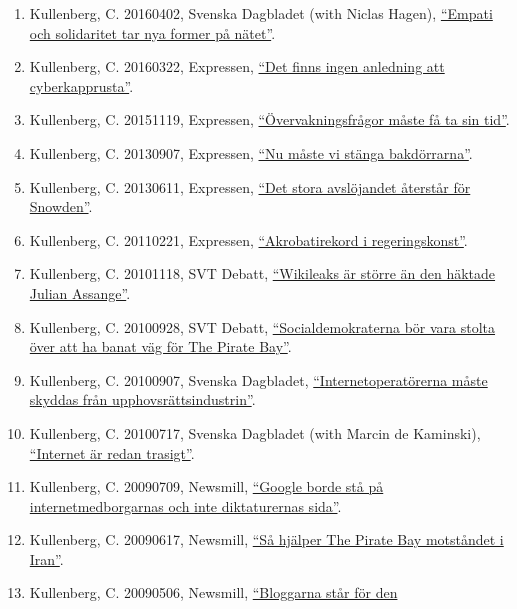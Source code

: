\documentclass[
]{article}
\providecommand{\tightlist}{%
  \setlength{\itemsep}{0pt}\setlength{\parskip}{0pt}}
\begin{document}
\begin{enumerate}
\def\labelenumi{\arabic{enumi}.}
\tightlist
\item
  Kullenberg, C. 20160402, Svenska Dagbladet (with Niclas Hagen),
  \href{http://www.svd.se/empati-och-solidaritet-tar-nya-former-pa-natet}{``Empati
  och solidaritet tar nya former på nätet''}.
\item
  Kullenberg, C. 20160322, Expressen,
  \href{http://www.expressen.se/debatt/finns-ingen-anledning-att-cyberkapprusta/}{``Det
  finns ingen anledning att cyberkapprusta''}.
\item
  Kullenberg, C. 20151119, Expressen,
  \href{http://www.expressen.se/debatt/overvakningsfragor-maste-fa-ta-sin-tid/}{``Övervakningsfrågor
  måste få ta sin tid''}.
\item
  Kullenberg, C. 20130907, Expressen,
  \href{http://www.expressen.se/debatt/nu-maste-vi-stanga-bakdorrarna/}{``Nu
  måste vi stänga bakdörrarna''}.
\item
  Kullenberg, C. 20130611, Expressen,
  \href{http://www.expressen.se/debatt/det-stora-avslojandet-aterstar-for-snowden/}{``Det
  stora avslöjandet återstår för Snowden''}.
\item
  Kullenberg, C. 20110221, Expressen,
  \href{http://www.expressen.se/debatt/christopher-kullenberg-akrobatikrekord-i-regeringskonst/}{``Akrobatirekord
  i regeringskonst''}.
\item
  Kullenberg, C. 20101118, SVT Debatt, \href{}{``Wikileaks är större än
  den häktade Julian Assange''}.
\item
  Kullenberg, C. 20100928, SVT Debatt, \href{}{``Socialdemokraterna bör
  vara stolta över att ha banat väg för The Pirate Bay''}.
\item
  Kullenberg, C. 20100907, Svenska Dagbladet,
  \href{http://www.svd.se/internetoperatorerna-maste-skyddas-fran-upphovsrattsindustrin}{``Internetoperatörerna
  måste skyddas från upphovsrättsindustrin''}.
\item
  Kullenberg, C. 20100717, Svenska Dagbladet (with Marcin de Kaminski),
  \href{http://www.svd.se/internet-ar-redan-trasigt}{``Internet är redan
  trasigt''}.
\item
  Kullenberg, C. 20090709, Newsmill, \href{}{``Google borde stå på
  internetmedborgarnas och inte diktaturernas sida''}.
\item
  Kullenberg, C. 20090617, Newsmill, \href{}{``Så hjälper The Pirate Bay
  motståndet i Iran''}.
\item
  Kullenberg, C. 20090506, Newsmill, \href{}{``Bloggarna står för den
}
\end{enumerate}
\end{document}
